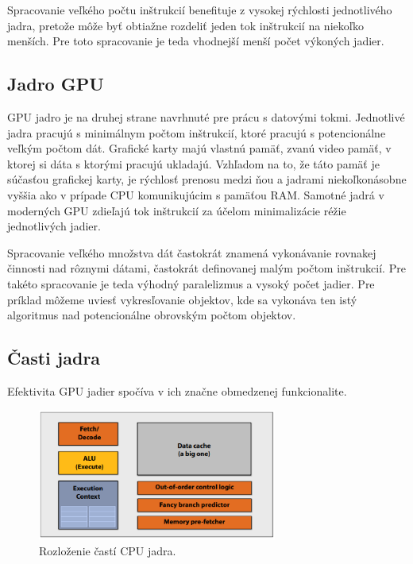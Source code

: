 Spracovanie veľkého počtu inštrukcií benefituje z vysokej rýchlosti jednotlivého jadra, pretože môže byť obtiažne rozdeliť jeden tok inštrukcií na niekoľko menších. Pre toto spracovanie je teda vhodnejší menší počet výkoných jadier.

\subsection*{Jadro GPU}
GPU jadro je na druhej strane navrhnuté pre prácu s datovými tokmi. Jednotlivé jadra pracujú s minimálnym počtom inštrukcií, ktoré pracujú s potencionálne veľkým počtom dát. Grafické karty majú vlastnú pamäť, zvanú video pamäť, v ktorej si dáta s ktorými pracujú ukladajú. Vzhľadom na to, že táto pamäť je súčasťou grafickej karty, je rýchlosť prenosu medzi ňou a jadrami niekoľkonásobne vyššia ako v prípade CPU komunikujúcim s pamäťou RAM. Samotné jadrá v moderných GPU zdieľajú tok inštrukcií za účelom minimalizácie réžie jednotlivých jadier.

\label{gpulogic}
Spracovanie veľkého množstva dát častokrát znamená vykonávanie rovnakej činnosti nad rôznymi dátami, častokrát definovanej malým počtom inštrukcií. Pre takéto spracovanie je teda výhodný paralelizmus a vysoký počet jadier. Pre príklad môžeme uviesť vykresľovanie objektov, kde sa vykonáva ten istý algoritmus nad potencionálne obrovským počtom objektov.

\subsection*{Časti jadra}
Efektivita GPU jadier spočíva v ich značne obmedzenej funkcionalite.

\begin{figure}[H]
	\centering
	\includegraphics[width=0.7\textwidth]{obrazky-figures/cpucore.eps}
	\caption{Rozloženie častí CPU jadra.}
	\label{cpucore}
\end{figure}

